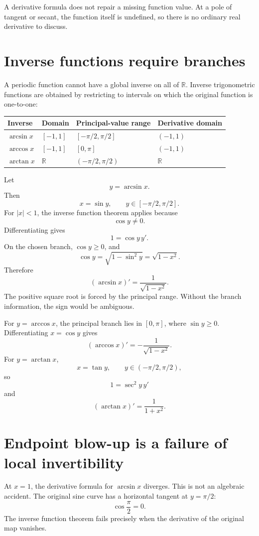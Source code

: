 A derivative formula does not repair a missing function value.  At a pole of tangent or secant, the function itself is undefined, so there is no ordinary real derivative to discuss.

\section{Inverse functions require branches}

A periodic function cannot have a global inverse on all of \(\mathbb R\).  Inverse trigonometric functions are obtained by restricting to intervals on which the original function is one-to-one:

\begin{center}
\small
\begin{tabularx}{\textwidth}{@{}lYYY@{}}
\toprule
Inverse & Domain & Principal-value range & Derivative domain\\
\midrule
\(\arcsin x\) & \([-1,1]\) & \([-\pi/2,\pi/2]\) & \((-1,1)\)\\
\(\arccos x\) & \([-1,1]\) & \([0,\pi]\) & \((-1,1)\)\\
\(\arctan x\) & \(\mathbb R\) & \((-\pi/2,\pi/2)\) & \(\mathbb R\)\\
\bottomrule
\end{tabularx}
\end{center}

Let
\[
  y=\arcsin x.
\]
Then
\[
  x=\sin y,
  \qquad
  y\in[-\pi/2,\pi/2].
\]
For \(|x|<1\), the inverse function theorem applies because
\[
  \cos y\ne0.
\]
Differentiating gives
\[
  1=\cos y\,y'.
\]
On the chosen branch, \(\cos y\ge0\), and
\[
  \cos y=\sqrt{1-\sin^2y}=\sqrt{1-x^2}.
\]
Therefore
\[
  \boxed{
  (\arcsin x)'=\frac1{\sqrt{1-x^2}}.}
\]
The positive square root is forced by the principal range.  Without the branch information, the sign would be ambiguous.

For \(y=\arccos x\), the principal branch lies in \([0,\pi]\), where \(\sin y\ge0\).  Differentiating \(x=\cos y\) gives
\[
  \boxed{
  (\arccos x)'=-\frac1{\sqrt{1-x^2}}.}
\]
For \(y=\arctan x\),
\[
  x=\tan y,
  \qquad
  y\in(-\pi/2,\pi/2),
\]
so
\[
  1=\sec^2y\,y'
\]
and
\[
  \boxed{
  (\arctan x)'=\frac1{1+x^2}.}
\]

\section{Endpoint blow-up is a failure of local invertibility}

At \(x=1\), the derivative formula for \(\arcsin x\) diverges.  This is not an algebraic accident.  The original sine curve has a horizontal tangent at \(y=\pi/2\):
\[
  \cos\frac\pi2=0.
\]
The inverse function theorem fails precisely when the derivative of the original map vanishes.

